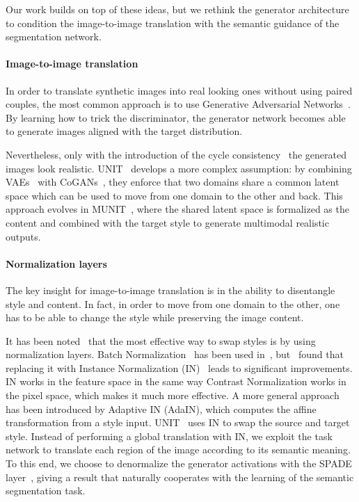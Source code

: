 \documentclass{bmvc2k}
\begin{document}
Our work builds on top of these ideas, but we rethink the generator architecture to condition the image-to-image translation with the semantic guidance of the segmentation network.

\paragraph{Image-to-image translation}
In order to translate synthetic images into real looking ones without using paired couples, the most common approach is to use Generative Adversarial Networks~\cite{gan}. By learning how to trick the discriminator, the generator network becomes able to generate images aligned with the target distribution.

Nevertheless, only with the introduction of the cycle consistency~\cite{cyclegan} the generated images look realistic. UNIT~\cite{unit} develops a more complex assumption: by combining VAEs~\cite{vae_kingma, rezende2014stochastic} with CoGANs~\cite{cogan}, they enforce that two domains share a common latent space which can be used to move from one domain to the other and back. This approach evolves in MUNIT~\cite{munit}, where the shared latent space is formalized as the content and combined with the target style to generate multimodal realistic outputs. 

\paragraph{Normalization layers}
The key insight for image-to-image translation is in the ability to disentangle style and content. In fact, in order to move from one domain to the other, one has to be able to change the style while preserving the image content.

It has been noted~\cite{adain} that the most effective way to swap styles is by using normalization layers. Batch Normalization~\cite{batchnorm} has been used in~\cite{texture}, but~\cite{improved-texture} found that replacing it with Instance Normalization (IN)~\cite{instancenorm} leads to significant improvements. IN works in the feature space in the same way Contrast Normalization works in the pixel space, which makes it much more effective. A more general approach has been introduced by Adaptive IN (AdaIN), which computes the affine transformation from a style input. UNIT~\cite{unit} uses IN to swap the source and target style. Instead of performing a global translation with IN, we exploit the task network to translate each region of the image according to its semantic meaning. To this end, we choose to denormalize the generator activations with the SPADE layer~\cite{spade}, giving a result that naturally cooperates with the learning of the semantic segmentation task.
\end{document}
